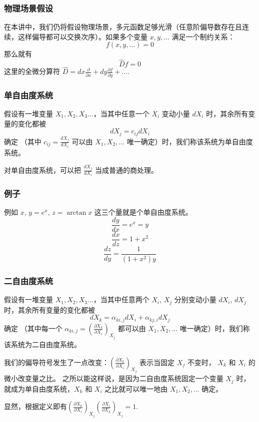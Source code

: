 \documentclass[CJK,13pt]{beamer}
\date{}
\begin{document}
  \bch

  \begin{frame}
    \frametitle{物理场景假设}
    在本讲中，我们仍将假设物理场景，多元函数足够光滑（任意阶偏导数存在且连续，这样偏导都可以交换次序）。如果多个变量 $x,y,\ldots$ 满足一个制约关系：
    $$f(x,y,\ldots) = 0$$
    那么就有
    $$ \hat{D} f = 0 $$
    这里的全微分算符  $\hat{D} = dx \frac{\partial}{\partial x} + dy \frac{\partial f}{\partial y} + \ldots $.
  \end{frame}



  
  \begin{frame}
    \frametitle{单自由度系统}
    假设有一堆变量 $X_1, X_2, X_3 \ldots$，当其中任意一个 $X_i$ 变动小量 $d X_i$ 时，其余所有变量的变化都被
    $$dX_j = c_{ij} dX_i $$
    确定 （其中 $c_{ij} = \frac{dX_j}{dX_i} $ 可以由 $X_1, X_2, \ldots $ 唯一确定）时，我们称该系统为{\blue 单自由度系统}。

    \skipline
    
    {\blue 对单自由度系统，可以把 $\frac{dX_j}{dX_i}$ 当成普通的商处理。}
  \end{frame}

  \begin{frame}
    \frametitle{例子}
    例如 $x$, $y=e^x$, $z=\arctan x$ 这三个量就是个单自由度系统。
    $$\frac{dy}{dx} = e^x = y$$
    $$\frac{dx}{dz} = 1+x^2 $$
    $$\frac{dz}{dy} = \frac{1}{(1+x^2)y} $$
  \end{frame}


  \begin{frame}
    \frametitle{二自由度系统}
    假设有一堆变量 $X_1, X_2, X_3 \ldots$，当其中任意两个 $X_i$, $X_j$ 分别变动小量 $d X_i$, $dX_j$ 时，其余所有变量的变化都被
    $$dX_k = \alpha_{ki,j} dX_i + \alpha_{kj,i} dX_j$$
    确定 （其中每一个 $\alpha_{ki,j} = \left(\frac{\partial X_k}{\partial X_i}\right)_{X_j}$ 都可以由 $X_1, X_2, \ldots $ 唯一确定）时，我们称该系统为{\blue 二自由度系统}。

    \skipline

    我们的偏导符号发生了一点改变：{\blue $ \left(\frac{\partial X_k}{\partial X_i}\right)_{X_j}$ 表示当固定 $X_j$ 不变时， $X_k$ 和 $X_i$ 的微小改变量之比。} 之所以能这样说，是因为二自由度系统固定一个变量 $X_j$ 时，就成为单自由度系统，$X_k$ 和 $X_i$ 之比就可以唯一地由  $X_1, X_2, \ldots $ 确定。

    \skipline
    
    显然，根据定义即有{\blue  $\left(\frac{\partial X_k}{\partial X_i}\right)_{X_j} \left(\frac{\partial X_i}{\partial X_k}\right)_{X_j} = 1$}.
  \end{frame}
\end{document}
